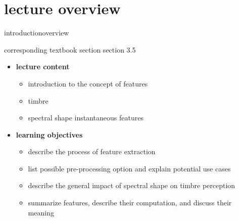     \section[overview]{lecture overview}
        \begin{frame}{introduction}{overview}
            \begin{block}{corresponding textbook section}
                    section 3.5
            \end{block}

            \begin{itemize}
                \item   \textbf{lecture content}
                    \begin{itemize}
                        \item   introduction to the concept of features
                        \item   timbre
                        \item   spectral shape instantaneous features
                   \end{itemize}
                \bigskip
                \item<2->   \textbf{learning objectives}
                    \begin{itemize}
                        \item   describe the process of feature extraction
                        \item   list possible pre-processing option and explain potential use cases
                        \item   describe the general impact of spectral shape on timbre perception
                        \item   summarize features, describe their computation, and discuss their meaning
                    \end{itemize}
            \end{itemize}
        \end{frame}

